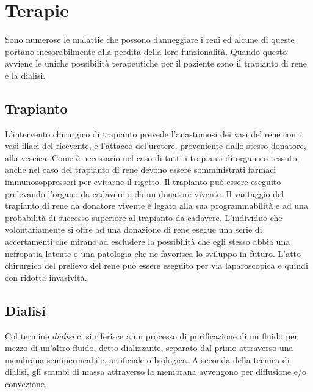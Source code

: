 \section{Terapie}
Sono numerose le malattie che possono danneggiare i reni ed alcune di queste portano inesorabilmente alla perdita della loro funzionalità. Quando questo avviene le uniche possibilità terapeutiche per il paziente sono il trapianto di rene e la dialisi.

\subsection{Trapianto \cite{hsr}}
L'intervento chirurgico di trapianto prevede l'anastomosi dei vasi del rene con i vasi iliaci del ricevente, e l'attacco del'uretere, proveniente dallo stesso donatore, alla vescica. Come è necessario nel caso di tutti i trapianti di organo o tessuto, anche nel caso del trapianto di rene devono essere somministrati farmaci immunosoppressori per evitarne il rigetto.
Il trapianto può essere eseguito prelevando l'organo da cadavere o da un donatore vivente. Il vantaggio del trapianto di rene da donatore vivente è legato alla sua programmabilità e ad una probabilità di successo superiore al trapianto da cadavere.  L'individuo che volontariamente si offre ad una donazione di rene esegue una serie di accertamenti che mirano ad escludere la possibilità che egli stesso abbia una nefropatia latente o una patologia che ne favorisca lo sviluppo in futuro. L'atto chirurgico del prelievo del rene può essere eseguito per via laparoscopica e quindi con ridotta invasività.

\subsection{Dialisi}\label{sub:dialisi}
Col termine \textit{dialisi} ci si riferisce a un processo di purificazione di un fluido per mezzo di un'altro fluido, detto dializzante, separato dal primo attraverso una membrana semipermeabile, artificiale o biologica. A seconda della tecnica di dialisi, gli scambi di massa attraverso la membrana avvengono per diffusione e/o convezione.

